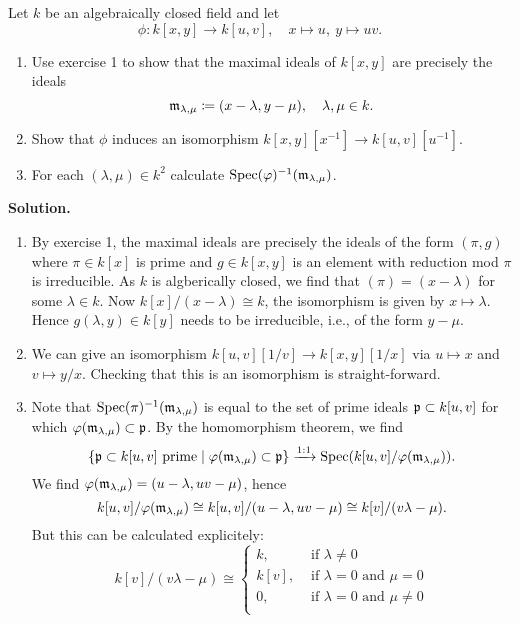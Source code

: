 \documentclass[a4paper,11pt]{article}
\begin{document}
Let $k$ be an algebraically closed field and let 
\begin{equation*}
    \phi: k[x,y] \to k[u,v], \quad x \mapsto u, \ y \mapsto uv.
\end{equation*}
\begin{enumerate}
    \item Use exercise 1 to show that the maximal ideals of $k[x,y]$ are precisely
        the ideals 
        \begin{equation*}
            \mathfrak{m}_{\lambda, \mu} \coloneqq (x-\lambda, y - \mu), \quad \lambda,
            \mu \in k.
        \end{equation*}
    \item Show that $\phi$ induces an isomorphism $k[x,y][x^{-1}] \to
        k[u,v][u^{-1}]$. 
    \item For each $(\lambda, \mu) \in k^2$ calculate
        $\operatorname{Spec}(\varphi)^{-1}(\mathfrak{m}_{\lambda, \mu})$. 
\end{enumerate}

\textbf{Solution.}
\begin{enumerate}
    \item By exercise 1, the maximal ideals are precisely the ideals of the 
        form $(\pi, g)$ where $\pi \in k[x]$ is prime and $g \in k[x,y]$ is an
        element with reduction mod $\pi$ is irreducible. As $k$ is algberically
        closed, we find that $(\pi) = (x-\lambda)$ for some $\lambda \in k$.
        Now $k[x]/(x-\lambda) \cong k$, the isomorphism is given by $x \mapsto 
        \lambda$. Hence $g(\lambda, y) \in k[y]$ needs to be irreducible, 
        i.e., of the form $y - \mu$. 
    \item We can give an isomorphism $k[u,v][1/v] \to k[x,y][1/x]$ via
        $u \mapsto x$ and $v \mapsto y/x$. Checking that this is an isomorphism
        is straight-forward. 
    \item Note that $\operatorname{Spec}(\pi)^{-1}(\mathfrak{m}_{\lambda, \mu})$ is equal to the set of
        prime ideals $\mathfrak{p} \subset k[u,v]$ for which $\varphi(\mathfrak{m}_{\lambda, \mu})
        \subset \mathfrak{p}$. By the homomorphism theorem, we find
        \begin{equation*}
            \{\mathfrak{p} \subset k[u,v] \text{ prime} \mid \varphi(\mathfrak{m}_{\lambda, \mu})
            \subset \mathfrak{p}\} \xrightarrow{1:1} \operatorname{Spec}(k[u,v]/\varphi(\mathfrak{m}_{\lambda, \mu})).
        \end{equation*}
        We find $\varphi(\mathfrak{m}_{\lambda, \mu}) = (u - \lambda, uv - \mu)$, hence 
        $$k[u,v] / \varphi(\mathfrak{m}_{\lambda, \mu}) \cong k[u,v]/(u - \lambda, uv - \mu)
        \cong k[v]/(v \lambda - \mu).$$
        But this can be calculated explicitely:
        \begin{equation*}
            k[v]/(v \lambda - \mu) \cong \begin{cases}
                k, &\text{ if } \lambda \neq 0 \\
                k[v], &\text{ if } \lambda = 0 \text{ and } \mu = 0\\
                0, &\text{ if } \lambda = 0 \text{ and } \mu \neq 0\\
            \end{cases}
        \end{equation*}
\end{enumerate}
\end{document}
